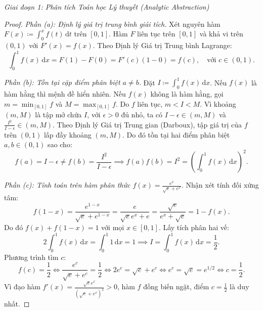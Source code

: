 \documentclass{article}
\begin{document}
\vspace{0.5em}\noindent\emph{Giai đoạn 1: Phân tích Toán học Lý thuyết (Analytic Abstraction)}

\begin{proof}
\emph{Phần (a): Định lý giá trị trung bình giải tích.}
Xét nguyên hàm $F(x) \coloneqq \int_0^x f(t)\,\mathrm{d}t$ trên $[0, 1]$. Hàm $F$ liên tục trên $[0, 1]$ và khả vi trên $(0, 1)$ với $F'(x) = f(x)$.
Theo Định lý Giá trị Trung bình Lagrange:
\begin{equation}
    \int_0^1 f(x)\,\mathrm{d}x = F(1) - F(0) = F'(c)(1 - 0) = f(c), \quad \text{với } c \in (0, 1).
\end{equation}

\emph{Phần (b): Tồn tại cặp điểm phân biệt $a \ne b$.}
Đặt $I \coloneqq \int_0^1 f(x)\,\mathrm{d}x$. Nếu $f(x)$ là hàm hằng thì mệnh đề hiển nhiên.
Nếu $f(x)$ không là hàm hằng, gọi $m = \min_{[0, 1]} f$ và $M = \max_{[0, 1]} f$. Do $f$ liên tục, $m < I < M$.
Vì khoảng $(m, M)$ là tập mở chứa $I$, với $\epsilon > 0$ đủ nhỏ, ta có $I - \epsilon \in (m, M)$ và $\frac{I^2}{I - \epsilon} \in (m, M)$.
Theo Định lý Giá trị Trung gian (Darboux), tập giá trị của $f$ trên $(0, 1)$ lấp đầy khoảng $(m, M)$. Do đó tồn tại hai điểm phân biệt $a, b \in (0, 1)$ sao cho:
\begin{equation}
    f(a) = I - \epsilon \ne f(b) = \frac{I^2}{I - \epsilon} \implies f(a) f(b) = I^2 = \left(\int_0^1 f(x)\,\mathrm{d}x\right)^2.
\end{equation}

\emph{Phần (c): Tính toán trên hàm phân thức $f(x) = \frac{e^x}{\sqrt{e} + e^x}$.}
Nhận xét tính đối xứng tâm:
\begin{equation}
    f(1 - x) = \frac{e^{1-x}}{\sqrt{e} + e^{1-x}} = \frac{e}{\sqrt{e} e^x + e} = \frac{\sqrt{e}}{e^x + \sqrt{e}} = 1 - f(x).
\end{equation}
Do đó $f(x) + f(1 - x) = 1$ với mọi $x \in [0, 1]$. Lấy tích phân hai vế:
\begin{equation}
    2 \int_0^1 f(x)\,\mathrm{d}x = \int_0^1 1\,\mathrm{d}x = 1 \implies I = \int_0^1 f(x)\,\mathrm{d}x = \frac{1}{2}.
\end{equation}
Phương trình tìm $c$:
\begin{equation}
    f(c) = \frac{1}{2} \iff \frac{e^c}{\sqrt{e} + e^c} = \frac{1}{2} \iff 2e^c = \sqrt{e} + e^c \iff e^c = \sqrt{e} = e^{1/2} \iff c = \frac{1}{2}.
\end{equation}
Vì đạo hàm $f'(x) = \frac{\sqrt{e}e^x}{(\sqrt{e}+e^x)^2} > 0$, hàm $f$ đồng biến ngặt, điểm $c = \frac{1}{2}$ là duy nhất.


\end{proof}
\end{document}
